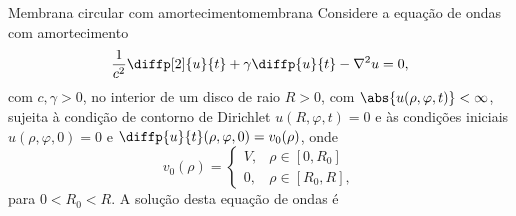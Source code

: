 \begin{proposition}{Membrana circular com amortecimento}{membrana}
    Considere a equação de ondas com amortecimento
    \begin{equation*}
        \frac{1}{c^2} \diffp[2]{u}{t} + \gamma \diffp{u}{t} - \nabla^2 u = 0,
    \end{equation*}
    com \(c, \gamma > 0\), no interior de um disco de raio \(R > 0\), com \(\abs{u(\rho, \varphi, t)} < \infty\), sujeita à condição de contorno de Dirichlet \(u(R, \varphi, t) = 0\) e às condições iniciais \(u(\rho, \varphi, 0) = 0\) e \(\diffp{u}{t}(\rho, \varphi, 0) = v_0(\rho)\), onde
    \begin{equation*}
        v_0(\rho) = \begin{cases}
            V,&\rho \in [0, R_0]\\
            0,& \rho \in [R_0, R],
        \end{cases}
    \end{equation*}
    para \(0 < R_0 < R\). A solução desta equação de ondas é
\end{proposition}
